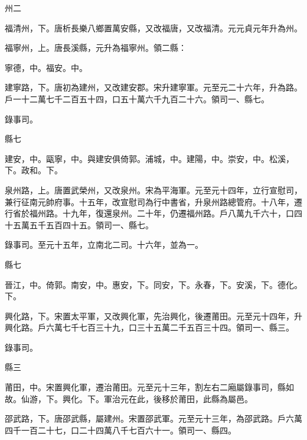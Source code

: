 \begin{pinyinscope}
 州二



 福清州，下。唐析長樂八鄉置萬安縣，又改福唐，又改福清。元元貞元年升為州。



 福寧州，上。唐長溪縣，元升為福寧州。領二縣：



 寧德，中。福安。中。



 建寧路，下。唐初為建州，又改建安郡。宋升建寧軍。元至元二十六年，升為路。戶一十二萬七千二百五十四，口五十萬六千九百二十六。領司一、縣七。



 錄事司。



 縣七



 建安，中。甌寧，中。與建安俱倚郭。浦城，中。建陽，中。崇安，中。松溪，下。政和。下。



 泉州路，上。唐置武榮州，又改泉州。宋為平海軍。元至元十四年，立行宣慰司，兼行征南元帥府事。十五年，改宣慰司為行中書省，升泉州路總管府。十八年，遷行省於福州路。十九年，復還泉州。二十年，仍遷福州路。戶八萬九千六十，口四十五萬五千五百四十五。領司一、縣七。



 錄事司。至元十五年，立南北二司。十六年，並為一。



 縣七



 晉江，中。倚郭。南安，中。惠安，下。同安，下。永春，下。安溪，下。德化。下。



 興化路，下。宋置太平軍，又改興化軍，先治興化，後遷莆田。元至元十四年，升興化路。戶六萬七千七百三十九，口三十五萬二千五百三十四。領司一、縣三。



 錄事司。



 縣三



 莆田，中。宋置興化軍，遷治莆田。元至元十三年，割左右二廂屬錄事司，縣如故。仙游，下。興化。下。軍治元在此，後移於莆田，此縣為屬邑。



 邵武路，下。唐邵武縣，屬建州。宋置邵武軍。元至元十三年，為邵武路。戶六萬四千一百二十七，口二十四萬八千七百六十一。領司一、縣四。




\end{pinyinscope}
